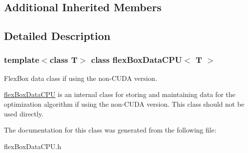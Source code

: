 \subsection*{Additional Inherited Members}


\subsection{Detailed Description}
\subsubsection*{template$<$class T$>$\newline
class flex\+Box\+Data\+C\+P\+U$<$ T $>$}

Flex\+Box data class if using the non-\/\+C\+U\+DA version. 

\hyperlink{classflex_box_data_c_p_u}{flex\+Box\+Data\+C\+PU} is an internal class for storing and maintaining data for the optimization algorithm if using the non-\/\+C\+U\+DA version. This class should not be used directly. 

The documentation for this class was generated from the following file\+:\begin{DoxyCompactItemize}
\item 
flex\+Box\+Data\+C\+P\+U.\+h\end{DoxyCompactItemize}
